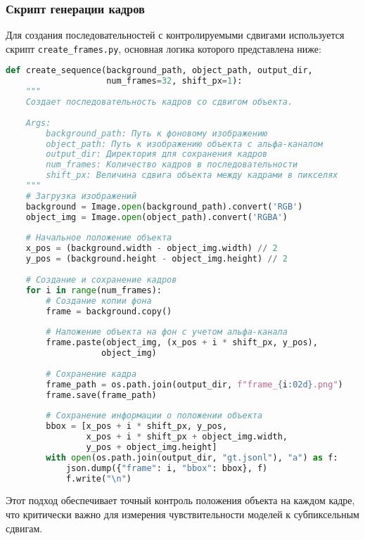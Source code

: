 \subsubsection{Скрипт генерации кадров}
\label{experiments:setup:data_generation:frames}

Для создания последовательностей с контролируемыми сдвигами используется скрипт \texttt{create\_frames.py}, основная логика которого представлена ниже:

\begin{lstlisting}[language=Python, caption={Основная логика генерации кадров с контролируемыми сдвигами}, label={lst:create_frames}]
def create_sequence(background_path, object_path, output_dir, 
                    num_frames=32, shift_px=1):
    """
    Создает последовательность кадров со сдвигом объекта.
    
    Args:
        background_path: Путь к фоновому изображению
        object_path: Путь к изображению объекта с альфа-каналом
        output_dir: Директория для сохранения кадров
        num_frames: Количество кадров в последовательности
        shift_px: Величина сдвига объекта между кадрами в пикселях
    """
    # Загрузка изображений
    background = Image.open(background_path).convert('RGB')
    object_img = Image.open(object_path).convert('RGBA')
    
    # Начальное положение объекта
    x_pos = (background.width - object_img.width) // 2
    y_pos = (background.height - object_img.height) // 2
    
    # Создание и сохранение кадров
    for i in range(num_frames):
        # Создание копии фона
        frame = background.copy()
        
        # Наложение объекта на фон с учетом альфа-канала
        frame.paste(object_img, (x_pos + i * shift_px, y_pos), 
                   object_img)
        
        # Сохранение кадра
        frame_path = os.path.join(output_dir, f"frame_{i:02d}.png")
        frame.save(frame_path)
        
        # Сохранение информации о положении объекта
        bbox = [x_pos + i * shift_px, y_pos, 
                x_pos + i * shift_px + object_img.width, 
                y_pos + object_img.height]
        with open(os.path.join(output_dir, "gt.jsonl"), "a") as f:
            json.dump({"frame": i, "bbox": bbox}, f)
            f.write("\n")
\end{lstlisting}

Этот подход обеспечивает точный контроль положения объекта на каждом кадре, что критически важно для измерения чувствительности моделей к субпиксельным сдвигам.

